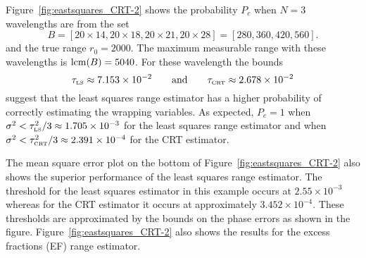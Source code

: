 Figure~\ref{fig:eastsquares_CRT-2} shows the probability $P_c$ when $N=3$ wavelengths are from the set
\[
B = [20\times14, 20\times18, 20\times21, 20\times28] = [280,   360,   420,   560].
\]
and the true range $r_0 = 2000$. The maximum measurable range with these wavelengths is $\operatorname{lcm}(B) = 5040$. For these wavelength the bounds 
\[
\tau_{\text{\tiny{LS}}} \approx 7.153 \times 10^{-2} \qquad \text{and} \qquad \tau_{\text{\tiny{CRT}}} \approx 2.678 \times 10^{-2}
\]
suggest that the least squares range estimator has a higher probability of correctly estimating the wrapping variables. As expected, $P_c = 1$ when $\sigma^2 < \tau_{\text{\tiny{LS}}}^2/3 \approx 1.705 \times 10^{-3} $ for the least squares range estimator and when $\sigma^2 < \tau_{\text{\tiny{CRT}}}^2/3 \approx 2.391 \times 10^{-4}$ for the CRT estimator.  %

The mean square error plot on the bottom of  Figure~\ref{fig:eastsquares_CRT-2} also shows the superior performance of the least squares range estimator. The threshold for the least squares estimator in this example occurs at $2.55\times 10^{-3}$ whereas for the CRT estimator it occurs at approximately $ 3.452\times 10^{-4}$. These thresholds are approximated by the bounds on the phase errors as shown in the figure. Figure~\ref{fig:eastsquares_CRT-2} also shows the results for the excess fractions (EF) range estimator.




